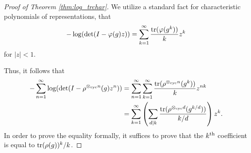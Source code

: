 \documentclass[12pt]{amsart}
\theoremstyle{plain}
\begin{document}
\begin{proof}[Proof of Theorem \ref{thm:log_trchar}]
We utilize a standard fact for characteristic polynomials of representations, that
\[
-\log(\det(I-\varphi(g)z)) = \sum_{k=1}^{\infty} \frac{{\rm tr}(\varphi(g^k))}{k} z^k
\]
for $|z|<1$.

Thus, it follows that
\begin{align*}
-\sum_{n=1}^{\infty}\log(\det(I-\rho^{\otimes_{\text{cyc}} n}(g)z^n)) &= \sum_{n=1}^{\infty}\sum_{k=1}^{\infty} \frac{{\rm tr}(\rho^{\otimes_{\text{cyc}} n}(g^k))}{k}z^{nk}\\
&=\sum_{k=1}^{\infty}\left(\sum_{d\mid k} \frac{{\rm tr}(\rho^{\otimes_{\text{cyc}} d}(g^{k/d}))}{k/d}\right)z^k.
\end{align*}
In order to prove the equality formally, it suffices to prove that the $k^{\rm th}$ coefficient is equal to ${\rm tr}(\rho(g))^{k}/k$.


\end{proof}
\end{document}
